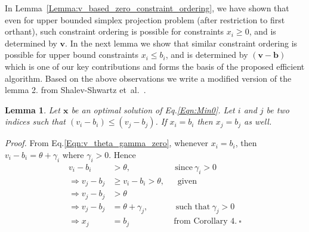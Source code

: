\documentclass{article}
\newtheorem{lemma}{Lemma}
\def\etal{{et~al.}}
\begin{document}
In Lemma~\ref{Lemma:v_based_zero_constraint_ordering}, we have shown that even for upper bounded simplex projection problem (after restriction to first orthant), such constraint ordering is possible for constraints $x_i \ge 0$, and is determined by $\mathbf{v}$.
In the next lemma we show that similar constraint ordering is possible for upper bound constraints $x_i \le b_i$, and is determined by $\mathbf{(v-b)}$ which is one of our key contributions and forms the basis of the proposed efficient algorithm. Based on the above observations we write a modified version of the lemma 2. from Shalev-Shwartz \etal~\cite{ShalevShwartz06}.
\begin{lemma}\label{Lemma:ub_constraint_order}
Let $\mathbf{x}$ be an optimal solution of Eq.\eqref{Eqn:Min0}. Let $i$ and $j$ be two indices such that $(v_i - b_i) \le (v_j - b_j)$. If $x_i = b_i$ then $x_j = b_j$ as well.
\end{lemma}
\emph{Proof.} From Eq.\eqref{Eqn:v_theta_gamma_zero}, whenever $x_i = b_i$, then $v_i-b_i = \theta + \gamma_i$ where $\gamma_i > 0$. Hence
\begin{align*}
              v_i-b_i &> \theta,~~~~~~~~~~~~~~~~~~~~~~~~\textrm{since} ~\gamma_i > 0 \\
  \Rightarrow v_j-b_j &\ge  v_i-b_i > \theta,~~~~~~~\textrm{given} \\
  \Rightarrow v_j-b_j &>  \theta \\
  \Rightarrow v_j-b_j &=  \theta + \gamma_j, ~~~~~~~~~~~~~~~\textrm{such that} ~\gamma_j > 0\\
  \Rightarrow x_j &= b_j~~~~~~~~~~~~~~~~~~~~~~~~\textrm{from Corollary 4}.~\square
\end{align*}
\end{document}

